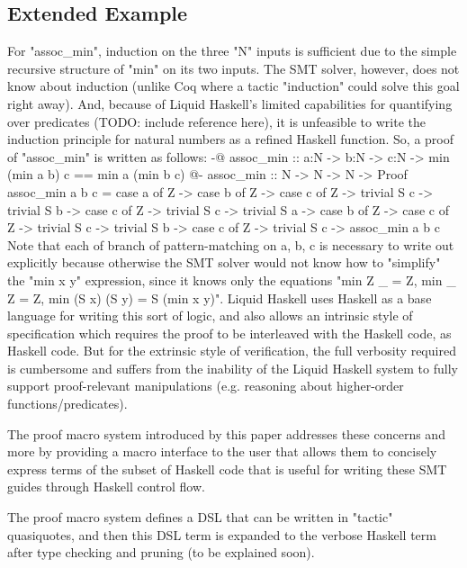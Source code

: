 \subsection{Extended Example}

For "assoc_min", induction on the three "N" inputs is sufficient due to the simple recursive structure of "min" on its two inputs.
The SMT solver, however, does not know about induction (unlike Coq where a tactic "induction" could solve this goal right away).
And, because of Liquid Haskell's limited capabilities for quantifying over predicates (TODO: include reference here), it is unfeasible to write the induction principle for natural numbers as a refined Haskell function.
So, a proof of "assoc_min" is written as follows:
  {-@ assoc_min :: a:N -> b:N -> c:N -> {min (min a b) c == min a (min b c)} @-}
  assoc_min :: N -> N -> N -> Proof
  assoc_min a b c =
    case a of 
      Z ->
        case b of 
          Z ->
            case c of
              Z -> trivial
              S c -> trivial
          S b ->
            case c of
              Z -> trivial
              S c -> trivial
    S a ->
      case b of 
        Z ->
          case c of
            Z -> trivial
            S c -> trivial
        S b ->
          case c of
            Z -> trivial
            S c -> assoc_min a b c
Note that each of branch of pattern-matching on a, b, c is necessary to write out explicitly because otherwise the SMT solver would not know how to "simplify" the "min x y" expression, since it knows only the equations "min Z _ = Z, min _ Z = Z, min (S x) (S y) = S (min x y)".
Liquid Haskell uses Haskell as a base language for writing this sort of logic, and also allows an intrinsic style of specification which requires the proof to be interleaved with the Haskell code, as Haskell code.
But for the extrinsic style of verification, the full verbosity required is cumbersome and suffers from the inability of the Liquid Haskell system to fully support proof-relevant manipulations (e.g. reasoning about higher-order functions/predicates).

The proof macro system introduced by this paper addresses these concerns and more by providing a macro interface to the user that allows them to concisely express terms of the subset of Haskell code that is useful for writing these SMT guides through Haskell control flow.

The proof macro system defines a DSL that can be written in "tactic" quasiquotes, and then this DSL term is expanded to the verbose Haskell term after type checking and pruning (to be explained soon).


